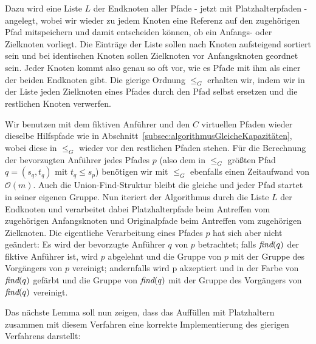 Dazu wird eine Liste $L$ der Endknoten aller Pfade - jetzt mit Platzhalterpfaden - angelegt, wobei wir wieder zu jedem Knoten
eine Referenz auf den zugehörigen Pfad mitspeichern und damit entscheiden können, ob ein Anfangs- oder Zielknoten vorliegt.
Die Einträge der Liste sollen nach Knoten aufsteigend sortiert sein und bei identischen Knoten sollen
Zielknoten vor Anfangsknoten geordnet sein.
Jeder Knoten kommt also genau so oft vor, wie es Pfade mit ihm als einer der beiden Endknoten gibt.
Die gierige Ordnung $\leq_{G}$ erhalten wir, indem wir in der Liste jeden Zielknoten eines Pfades durch den Pfad selbst
ersetzen und die restlichen Knoten verwerfen.

Wir benutzen mit dem fiktiven Anführer und den $C$ virtuellen Pfaden wieder dieselbe Hilfspfade wie in
Abschnitt~\ref{subsec:algorithmusGleicheKapazitäten}, wobei diese in $\leq_G$ wieder vor den restlichen Pfaden stehen.
Für die Berechnung der bevorzugten Anführer jedes Pfades $p$ (also dem in $\leq_G$ größten Pfad $q = (s_q, t_q)$ mit
$t_q \leq s_p$) benötigen wir mit $\leq_G$ ebenfalls einen Zeitaufwand von
$\mathcal O(m)$.
Auch die Union-Find-Struktur bleibt die gleiche und jeder Pfad startet in seiner eigenen Gruppe.
Nun iteriert der Algorithmus durch die Liste $L$ der Endknoten und verarbeitet dabei Platzhalterpfade beim Antreffen vom
zugehörigen Anfangsknoten und Originalpfade beim Antreffen vom zugehörigen Zielknoten.
Die eigentliche Verarbeitung eines Pfades $p$ hat sich aber nicht geändert: Es wird der bevorzugte Anführer $q$ von $p$
betrachtet;
falls $\text{\em find}(q)$ der fiktive Anführer ist, wird $p$ abgelehnt und die Gruppe von $p$ mit der
Gruppe des Vorgängers von $p$ vereinigt;
andernfalls wird p akzeptiert und in der Farbe von $\text{\em find}(q)$
gefärbt und die Gruppe von $\text{\em find}(q)$ mit der Gruppe des Vorgängers von $\text{\em find}(q)$ vereinigt.

Das nächste Lemma soll nun zeigen, dass das Auffüllen mit Platzhaltern zusammen mit diesem Verfahren eine korrekte
Implementierung des gierigen Verfahrens darstellt:

